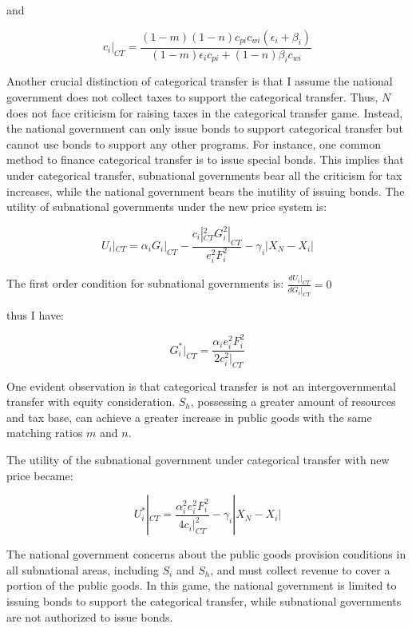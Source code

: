 and

\begin{equation}
    c_i|_{CT}=\frac{(1-m)(1-n)c_{pi}c_{wi}(\epsilon_i+\beta_i)}{(1-m) \epsilon_i c_{pi}+(1-n)\beta_i c_{wi}} \label{666}
\end{equation}

Another crucial distinction of categorical transfer is that I assume the national government does not collect taxes to support the categorical transfer. Thus, $N$ does not face criticism for raising taxes in the categorical transfer game. Instead, the national government can only issue bonds to support categorical transfer but cannot use bonds to support any other programs. For instance, one common method to finance categorical transfer is to issue special bonds. This implies that under categorical transfer, subnational governments bear all the criticism for tax increases, while the national government bears the inutility of issuing bonds. The utility of subnational governments under the new price system is: %

\begin{equation}
    U_i|_{CT}=\alpha_iG_i|_{CT}-\frac{c_i|_{CT}^2G_i^2|_{CT}}{e_i^2F_i^2}-\gamma_i|X_N-X_i|
\end{equation}

The first order condition for subnational governments is:
$\frac{dU_i|_{CT}}{dG_i|_{CT}}=0$

thus I have:

\begin{equation}
    G_i^*|_{CT}=\frac{\alpha_i e_i^2 F_i^2}{2 c_i^2|_{CT}}
\end{equation}

One evident observation is that categorical transfer is not an intergovernmental transfer with equity consideration. $S_h$, possessing a greater amount of resources and tax base, can achieve a greater increase in public goods with the same matching ratios $m$ and $n$.

The utility of the subnational government under categorical transfer with new price became:

\begin{equation}
    U_i^*|_{CT}=\frac{\alpha_i^2 e_i^2 F_i^2}{4c_i|_{CT}^2}-\gamma_i|X_N-X_i|\label{uforsiinct}
\end{equation}

The national government concerns about the public goods provision conditions in all subnational areas, including $S_i$ and $S_h$, and must collect revenue to cover a portion of the public goods. In this game, the national government is limited to issuing bonds to support the categorical transfer, while subnational governments are not authorized to issue bonds.

